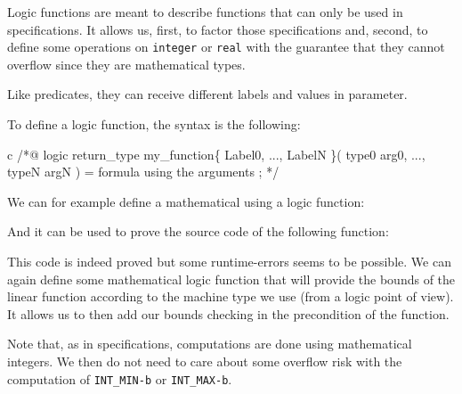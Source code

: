 Logic functions are meant to describe functions that can only be used in
specifications. It allows us, first, to factor those specifications and,
second, to define some operations on \texttt{integer} or \texttt{real}
with the guarantee that they cannot overflow since they are mathematical
types.

Like predicates, they can receive different labels and values in
parameter.





To define a logic function, the syntax is the following:



\begin{CodeBlock}{c}
/*@
  logic return_type my_function\{ Label0, ..., LabelN \}( type0 arg0, ..., typeN argN ) =
    formula using the arguments ;
*/
\end{CodeBlock}



We can for example define a mathematical  using a logic function:






And it can be used to prove the source code of the following function:








This code is indeed proved but some runtime-errors seems to be possible.
We can again define some mathematical logic function that will provide the bounds of
the linear function according to the machine type we use (from a logic point of
view). It allows us to then add our bounds checking in the precondition of the
function.






\begin{Information}
  Note that, as in specifications, computations are done using mathematical
  integers. We then do not need to care about some overflow risk with the
  computation of \texttt{INT\_MIN-b} or \texttt{INT\_MAX-b}.
\end{Information}


